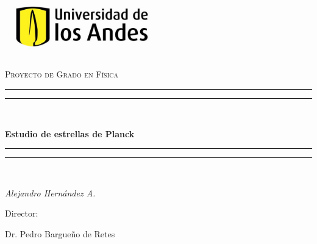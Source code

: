 \documentclass[16pt,a4paper]{article}
\numberwithin{equation}{section}
\theoremstyle{definition}
\begin{document}
\begin{titlepage}
	\centering
	\vspace*{\baselineskip} 
	\includegraphics[width=0.5\textwidth]{logo_uniandes}\par\vspace{1cm}
	{\scshape\Large Proyecto de Grado en Física\par}
	\vspace{1.5cm}
	\rule{\textwidth}{1.6pt}\vspace*{-\baselineskip}\vspace*{2pt}
	\rule{\textwidth}{0.4pt}\\[\baselineskip]
	{\huge\bfseries Estudio de estrellas de Planck\par}
	\rule{\textwidth}{0.4pt}\vspace*{-\baselineskip}\vspace{3.2pt}
	\rule{\textwidth}{1.6pt}\\[\baselineskip]
	\vspace{2cm}
	{\Large\itshape Alejandro Hernández A.\par}
	\vfill
	Director:\par
	Dr. Pedro Bargueño de Retes 
	\vfill

\end{titlepage}
\end{document}
